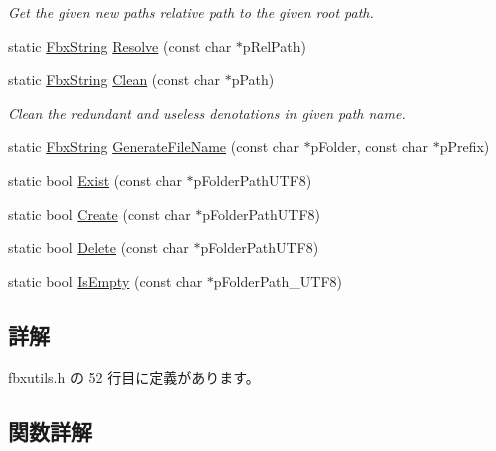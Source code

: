 \begin{DoxyCompactItemize}
\begin{DoxyCompactList}\small\item\em Get the given new path\textquotesingle{}s relative path to the given root path. \end{DoxyCompactList}\item 
static \hyperlink{class_fbx_string}{Fbx\+String} \hyperlink{class_fbx_path_utils_a5adc2b4d7bed904ba22f3613f9bb729a}{Resolve} (const char $\ast$p\+Rel\+Path)
\item 
static \hyperlink{class_fbx_string}{Fbx\+String} \hyperlink{class_fbx_path_utils_a33d8212ceaa902e1161882ab8d69e3ca}{Clean} (const char $\ast$p\+Path)
\begin{DoxyCompactList}\small\item\em Clean the redundant and useless denotations in given path name. \end{DoxyCompactList}\item 
static \hyperlink{class_fbx_string}{Fbx\+String} \hyperlink{class_fbx_path_utils_a0680775ad53444cc7dd91bdd537384ca}{Generate\+File\+Name} (const char $\ast$p\+Folder, const char $\ast$p\+Prefix)
\item 
static bool \hyperlink{class_fbx_path_utils_a5098828efd68614f77bc7bbe5f73f7cf}{Exist} (const char $\ast$p\+Folder\+Path\+U\+T\+F8)
\item 
static bool \hyperlink{class_fbx_path_utils_aa644a8ad1e94eb8a522e6fd653824e93}{Create} (const char $\ast$p\+Folder\+Path\+U\+T\+F8)
\item 
static bool \hyperlink{class_fbx_path_utils_a7061a14d4a9f5dae1353d16d7155ee06}{Delete} (const char $\ast$p\+Folder\+Path\+U\+T\+F8)
\item 
static bool \hyperlink{class_fbx_path_utils_a3b887263947d818084273ed982617fec}{Is\+Empty} (const char $\ast$p\+Folder\+Path\+\_\+\+U\+T\+F8)
\end{DoxyCompactItemize}


\subsection{詳解}


 fbxutils.\+h の 52 行目に定義があります。



\subsection{関数詳解}
\mbox{\label{class_fbx_path_utils_a1653196effd4938fe520afd70ad09c56}} 
